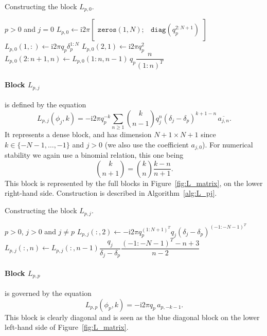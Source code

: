 \documentclass[12pt,a4paper,fleqn]{article}
\newcommand{\conj}[1]{\overline{#1}}
\renewcommand{\i}{\mathrm{i}}
\begin{document}
\begin{algorithm}
  \caption{Constructing the block $L_{p,0}$.}
  \label{alg:L_p0}
  \begin{algorithmic}
    \REQUIRE $p > 0$ and $j = 0$
      \STATE $L_{p,0} \leftarrow \i2\pi \begin{bmatrix} \mathtt{zeros}(1,N); & \mathtt{diag}(q_p^{2:N+1}) \end{bmatrix}$
    \ELSE[$\delta_p > 0$]
      \STATE $L_{p,0}(1,:) \leftarrow \i2\pi q_p \delta_p^{1:N}$
      \STATE $L_{p,0}(2,1) \leftarrow \i2\pi q_p^2$
        \STATE $L_{p,0}(2:n+1,n) \leftarrow L_{p,0}(1:n,n-1) \,q_p \dfrac{n}{(1:n)^T}$
      \ENDFOR
    \ENDIF
  \end{algorithmic}
\end{algorithm}

\paragraph{Block $L_{p,j}$} is defined by the equation
\begin{equation}
  L_{p,j}(\phi_j,k) = -\i2\pi q_p^{-k} \sum_{n\ge 1} \binom{k}{n-1} q_j^n(\delta_j - \delta_p)^{k+1-n} \,\conj{a_{j,n}}.
  \label{eq:block_Lpj}
\end{equation}
It represents a dense block, and has dimension $N+1\times N+1$ since $k\in \{-N-1, \dots, -1\}$ and $j>0$ (we also use the coefficient $a_{j,0}$). For numerical stability we again use a binomial relation, this one being
\begin{equation}
  \binom{k}{n+1} = \binom{k}{n} \frac{k-n}{n+1}.
\end{equation}
This block is represented by the full blocks in Figure~\ref{fig:L_matrix}, on the lower right-hand side. Construction is described in Algorithm~\ref{alg:L_pj}.

\begin{algorithm}
  \caption{Constructing the block $L_{p,j}$.}
  \label{alg:L_pj}
  \begin{algorithmic}
    \REQUIRE $p > 0$, $j>0$ and $j\ne p$
    \STATE $L_{p,j}(:,2) \leftarrow -\i2\pi q_p^{(1:N+1)^T} q_j(\delta_j - \delta_p)^{(-1:-N-1)^T}$
    \STATE $L_{p,j}(:,n) \leftarrow L_{p,j}(:,n-1) \dfrac{q_j}{\delta_j - \delta_p} \dfrac{(-1:-N-1)^T - n+3}{n-2}$
    \ENDFOR
  \end{algorithmic}
\end{algorithm}

\paragraph{Block $L_{p,p}$} is governed by the equation
\begin{equation}
  L_{p,p}(\phi_p,k) = -\i2\pi q_p \,a_{p,-k-1}.
  \label{eq:block_Lpp}
\end{equation}
This block is clearly diagonal and is seen as the blue diagonal block on the lower left-hand side of Figure~\ref{fig:L_matrix}.
\end{document}
